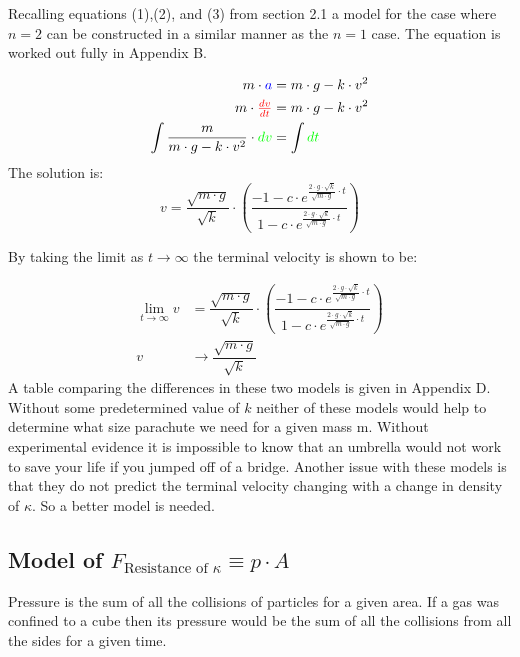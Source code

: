 \documentclass[12pt,letterpaper,final]{article}
\begin{document}
Recalling equations (1),(2), and (3) from section 2.1 a model for the case where $n = 2$ can be constructed in a similar manner as the $n = 1$ case. The equation is worked out fully in Appendix B.

\begin{equation}
\begin{align}
						m \cdot \color{blue}a\color{black} &= m \cdot g - k \cdot v^{2}\\
m\cdot \color{red}\tfrac{dv}{dt}\color{black} &= m \cdot g - k \cdot v^{2}\\
\int\dfrac{m}{m \cdot g - k \cdot v^{2}}\cdot \color{green}dv\color{black} &= \int \color{green}dt\color{black}\\
\end{align}
\end{equation}
The solution is:
\begin{equation}
v = \dfrac{\sqrt{m \cdot g}}{\sqrt{k}}\cdot \left(\dfrac{-1 - c \cdot\textit{e}^{\tfrac{2\cdot g \cdot\sqrt{k}}{\sqrt{m \cdot g}}\cdot t}}{1 - c \cdot\textit{e}^{\tfrac{2\cdot g \cdot\sqrt{k}}{\sqrt{m \cdot g}}\cdot t}}\right)
\end{equation}

By taking the limit as $t \to \infty$ the terminal velocity is shown to be:

\begin{equation}
\begin{align}
\lim_{t \to \infty} v &= \dfrac{\sqrt{m \cdot g}}{\sqrt{k}}\cdot \left(\dfrac{-1 - c \cdot\textit{e}^{\tfrac{2\cdot g \cdot\sqrt{k}}{\sqrt{m \cdot g}}\cdot t}}{1 - c \cdot\textit{e}^{\tfrac{2\cdot g \cdot\sqrt{k}}{\sqrt{m \cdot g}}\cdot t}}\right)\\
v &\to \dfrac{\sqrt{m \cdot g}}{\sqrt{k}}
\end{align}
\end{equation}
A table comparing the differences in these two models is given in Appendix D. Without some predetermined value of $k$ neither of these models would help to determine what size parachute we need for a given mass m. Without experimental evidence it is impossible to know that an umbrella would not work to save your life if you jumped off of a bridge. Another issue with these models is that they do not predict the terminal velocity changing with a change in density of $\kappa$. So a better model is needed.

\subsection{Model of $F_{\text{Resistance of }\kappa} \equiv p \cdot A$}
Pressure is the sum of all the collisions of particles for a given area. If a gas was confined to a cube then its pressure would be the sum of all the collisions from all the sides for a given time.\\
\end{document}
